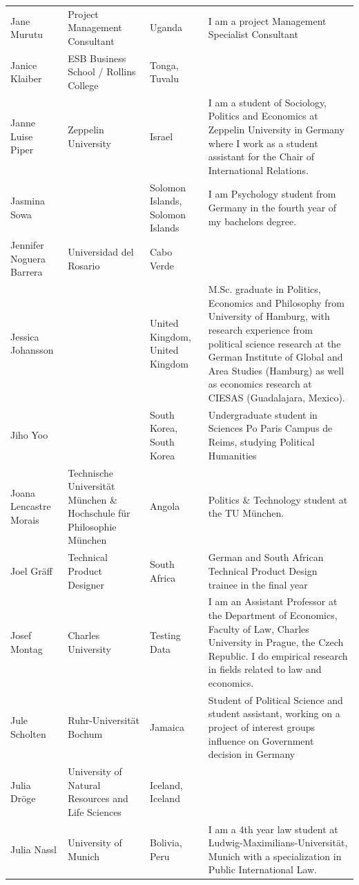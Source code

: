 \documentclass[
]{article}
\begin{document}
\begin{longtable}[t]{l>{\raggedright\arraybackslash}p{2cm}>{\raggedright\arraybackslash}p{2cm}>{\raggedright\arraybackslash}p{3cm}}
\rowcolor{gray!6}  Jane Murutu & Project Management Consultant & Uganda & I am a project Management Specialist Consultant\\
Janice Klaiber & ESB Business School / Rollins College & Tonga, Tuvalu & \\
\rowcolor{gray!6}  Janne Luise Piper & Zeppelin University & Israel & I am a student of Sociology, Politics and Economics at Zeppelin University in Germany where I work as a student assistant for the Chair of International Relations.\\
\addlinespace
Jasmina Sowa &  & Solomon Islands, Solomon Islands & I am Psychology student from Germany in the fourth year of my bachelors degree.\\
\rowcolor{gray!6}  Jennifer Noguera Barrera & Universidad del Rosario & Cabo Verde & \\
Jessica Johansson &  & United Kingdom, United Kingdom & M.Sc. graduate in Politics, Economics and Philosophy from University of Hamburg, with research experience from political science research at the German Institute of Global and Area Studies (Hamburg) as well as economics research at CIESAS (Guadalajara, Mexico).\\
\rowcolor{gray!6}  Jiho Yoo &  & South Korea, South Korea & Undergraduate student in Sciences Po Paris Campus de Reims, studying Political Humanities\\
Joana Lencastre Morais & Technische Universität München \& Hochschule für Philosophie München & Angola & Politics \& Technology student at the TU München.\\
\addlinespace
\rowcolor{gray!6}  Joel Gräff & Technical Product Designer & South Africa & German and South African Technical Product Design trainee in the final year\\
Josef Montag & Charles University & Testing Data & I am an Assistant Professor at the Department of Economics, Faculty of Law, Charles University in Prague, the Czech Republic. I do empirical research in fields related to law and economics.\\
\rowcolor{gray!6}  Jule Scholten & Ruhr-Universität Bochum & Jamaica & Student of Political Science and student assistant, working on a project of interest groups influence on Government decision in Germany\\
Julia Dröge & University of Natural Resources and Life Sciences & Iceland, Iceland & \\
\rowcolor{gray!6}  Julia Nassl & University of Munich & Bolivia, Peru & I am a 4th year law student at Ludwig-Maximilians-Universität, Munich with a specialization in Public International Law.\\

\end{longtable}
\end{document}
